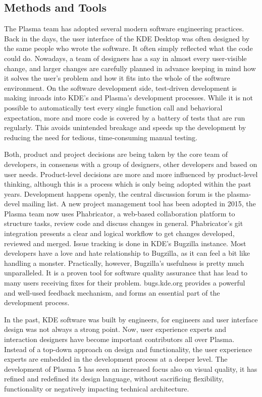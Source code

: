\subsection*{Methods and Tools}

The Plasma team has adopted several modern software engineering practices. Back in the days, the user interface of the KDE Desktop was often designed by the same people who wrote the software. It often simply reflected what the code could do. Nowadays, a team of designers has a say in almost every user-visible change, and larger changes are carefully planned in advance keeping in mind how it solves the user's problem and how it fits into the whole of the software environment.
On the software development side, test-driven development is making inroads into KDE's and Plasma's development processes. While it is not possible to automatically test every single function call and behavioral expectation, more and more code is covered by a battery of tests that are run regularly. This avoids unintended breakage and speeds up the development by reducing the need for tedious, time-consuming manual testing.

Both, product and project decisions are being taken by the core team of developers, in consensus with a group of designers, other developers and based on user needs. Product-level decisions are more and more influenced by product-level thinking, although this is a process which is only being adopted within the past years.
Development happens openly, the central discussion forum is the plasma-devel mailing list. A new project management tool has been adopted in 2015, the Plasma team now uses Phabricator, a web-based collaboration platform to structure tasks, review code and discuss changes in general. Phabricator's git integration presents a clear and logical workflow to get changes developed, reviewed and merged.
Issue tracking is done in KDE's Bugzilla instance. Most developers have a love and hate relationship to Bugzilla, as it can feel a bit like handling a monster. Practically, however, Bugzilla's usefulness is pretty much unparalleled. It is a proven tool for software quality assurance that has lead to many users receiving fixes for their problem. bugs.kde.org provides a powerful and well-used feedback mechanism, and forms an essential part of the development process.

In the past, KDE software was built by engineers, for engineers and user interface design was not always a strong point. Now, user experience experts and interaction designers have become important contributors all over Plasma. Instead of a top-down approach on design and functionality, the user experience experts are embedded in the development process at a deeper level. The development of Plasma 5 has seen an increased focus also on visual quality, it has refined and redefined its design language, without sacrificing flexibility, functionality or negatively impacting technical architecture.

